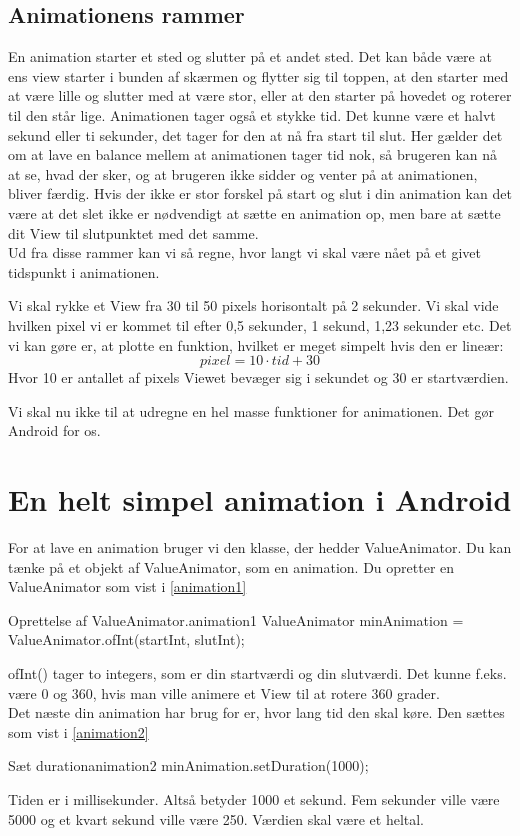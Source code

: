 \subsection{Animationens rammer}
En animation starter et sted og slutter på et andet sted. Det kan både være at ens view starter i bunden af skærmen og flytter sig til toppen, at den starter med at være lille og slutter med at være stor, eller at den starter på hovedet og roterer til den står lige.
Animationen tager også et stykke tid. Det kunne være et halvt sekund eller ti sekunder, det tager for den at nå fra start til slut. Her gælder det om at lave en balance mellem at animationen tager tid nok, så brugeren kan nå at se, hvad der sker, og at brugeren ikke sidder og venter på at animationen, bliver færdig. Hvis der ikke er stor forskel på start og slut i din animation kan det være at det slet ikke er nødvendigt at sætte en animation op, men bare at sætte dit View til slutpunktet med det samme.  \\
Ud fra disse rammer kan vi så regne, hvor langt vi skal være nået på et givet tidspunkt i animationen. 
\begin{example}
	Vi skal rykke et View fra 30 til 50 pixels horisontalt på 2 sekunder. Vi skal vide hvilken pixel vi er kommet til efter 0,5 sekunder, 1 sekund, 1,23 sekunder etc. Det vi kan gøre er, at plotte en funktion, hvilket er meget simpelt hvis den er lineær:
	\begin{equation}
	pixel=10\cdot tid+30
	\end{equation}
	Hvor 10 er antallet af pixels Viewet bevæger sig i sekundet og 30 er startværdien.
\end{example}
Vi skal nu ikke til at udregne en hel masse funktioner for animationen. Det gør Android for os.
\section{En helt simpel animation i Android}
For at lave en animation bruger vi den klasse, der hedder ValueAnimator. Du kan tænke på et objekt af ValueAnimator, som en animation. Du opretter en ValueAnimator som vist i \autoref{animation1}
\begin{JavaCode}{Oprettelse af ValueAnimator.}{animation1}
	ValueAnimator minAnimation = ValueAnimator.ofInt(startInt, slutInt);
\end{JavaCode}
ofInt() tager to integers, som er din startværdi og din slutværdi. Det kunne f.eks. være 0 og 360, hvis man ville animere et View til at rotere 360 grader. \\
Det næste din animation har brug for er, hvor lang tid den skal køre. Den sættes som vist i \autoref{animation2}
\begin{JavaCode}{Sæt duration}{animation2}
	minAnimation.setDuration(1000);	
\end{JavaCode}
Tiden er i millisekunder. Altså betyder 1000 et sekund. Fem sekunder ville være 5000 og et kvart sekund ville være 250. Værdien skal være et heltal.
